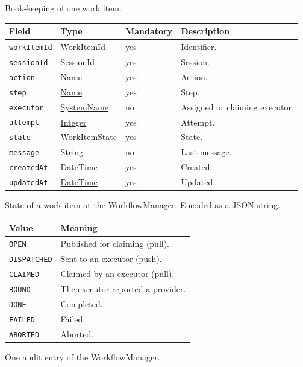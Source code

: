 \documentclass[a4paper]{arrowhead}
\newcommand{\mref}[1]{{\textcolor{ArrowheadPurple}{\hyperref[sec:model:#1]{#1}}}}
\newcommand{\pref}[1]{{\textcolor{ArrowheadGrey}{\hyperref[sec:model:primitives:#1]{#1}}}}
\begin{document}
Book-keeping of one work item.

{\small
\begin{longtable}{|p{3.7cm}|p{4.2cm}|p{1.6cm}|p{6.3cm}|}

\hline
\rowcolor{gray!33} Field & Type & Mandatory & Description \\ \hline
\endhead
\texttt{workItemId} & \pref{WorkItemId} & yes & Identifier. \\ \hline
\texttt{sessionId} & \pref{SessionId} & yes & Session. \\ \hline
\texttt{action} & \pref{Name} & yes & Action. \\ \hline
\texttt{step} & \pref{Name} & yes & Step. \\ \hline
\texttt{executor} & \pref{SystemName} & no & Assigned or claiming executor. \\ \hline
\texttt{attempt} & \pref{Integer} & yes & Attempt. \\ \hline
\texttt{state} & \mref{WorkItemState} & yes & State. \\ \hline
\texttt{message} & \pref{String} & no & Last message. \\ \hline
\texttt{createdAt} & \pref{DateTime} & yes & Created. \\ \hline
\texttt{updatedAt} & \pref{DateTime} & yes & Updated. \\ \hline
\end{longtable}
}

State of a work item at the WorkflowManager.
 Encoded as a JSON string.
{\small
\begin{longtable}{|p{3.9cm}|p{11.9cm}|}

\hline
\rowcolor{gray!33} Value & Meaning \\ \hline
\endhead
\texttt{OPEN} & Published for claiming (pull). \\ \hline
\texttt{DISPATCHED} & Sent to an executor (push). \\ \hline
\texttt{CLAIMED} & Claimed by an executor (pull). \\ \hline
\texttt{BOUND} & The executor reported a provider. \\ \hline
\texttt{DONE} & Completed. \\ \hline
\texttt{FAILED} & Failed. \\ \hline
\texttt{ABORTED} & Aborted. \\ \hline
\end{longtable}
}

One audit entry of the WorkflowManager.
\end{document}
